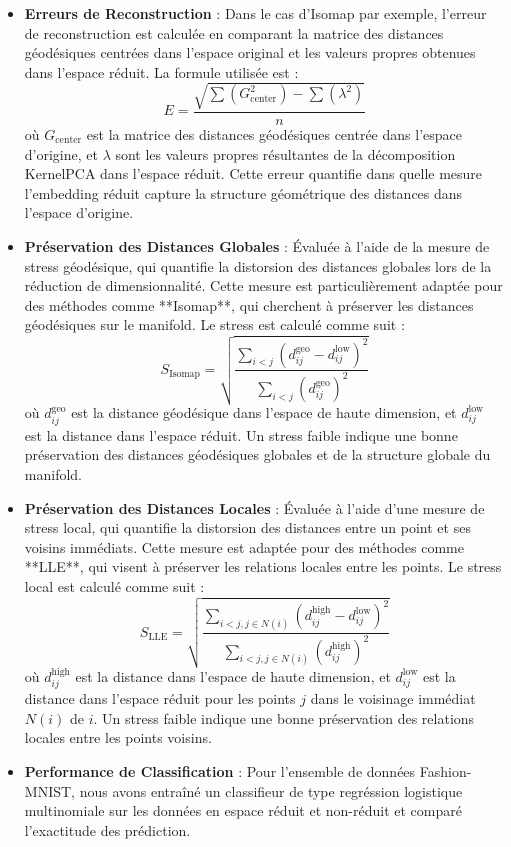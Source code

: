\documentclass[unnumsec,webpdf,modern,large]{projet_manifold}%
\theoremstyle{thmstyleone}%
\theoremstyle{thmstyletwo}%
\theoremstyle{thmstylethree}%
\begin{document}
\begin{itemize} 
    \item \textbf{Erreurs de Reconstruction} : Dans le cas d'Isomap par exemple, l'erreur de reconstruction est calculée en comparant la matrice des distances géodésiques centrées dans l'espace original et les valeurs propres obtenues dans l'espace réduit. La formule utilisée est :
    \begin{equation}
    E = \frac{\sqrt{\sum (G_{\text{center}}^2) - \sum (\lambda^2)}}{n}
    \end{equation}
    où $G_{\text{center}}$ est la matrice des distances géodésiques centrée dans l'espace d'origine, et $\lambda$ sont les valeurs propres résultantes de la décomposition KernelPCA dans l'espace réduit. Cette erreur quantifie dans quelle mesure l'embedding réduit capture la structure géométrique des distances dans l'espace d'origine.


    \item \textbf{Préservation des Distances Globales} : Évaluée à l'aide de la mesure de stress géodésique, qui quantifie la distorsion des distances globales lors de la réduction de dimensionnalité. Cette mesure est particulièrement adaptée pour des méthodes comme **Isomap**, qui cherchent à préserver les distances géodésiques sur le manifold. Le stress est calculé comme suit :
    \begin{equation}
    S_{\text{Isomap}} = \sqrt{\frac{\sum_{i < j} (d_{ij}^{\text{geo}} - d_{ij}^{\text{low}})^2}{\sum_{i < j} (d_{ij}^{\text{geo}})^2}}
    \end{equation}
    où $d_{ij}^{\text{geo}}$ est la distance géodésique dans l'espace de haute dimension, et $d_{ij}^{\text{low}}$ est la distance dans l'espace réduit. Un stress faible indique une bonne préservation des distances géodésiques globales et de la structure globale du manifold.

\item \textbf{Préservation des Distances Locales} : Évaluée à l'aide d'une mesure de stress local, qui quantifie la distorsion des distances entre un point et ses voisins immédiats. Cette mesure est adaptée pour des méthodes comme **LLE**, qui visent à préserver les relations locales entre les points. Le stress local est calculé comme suit :
    \begin{equation}
    S_{\text{LLE}} = \sqrt{\frac{\sum_{i < j, j \in N(i)} (d_{ij}^{\text{high}} - d_{ij}^{\text{low}})^2}{\sum_{i < j, j \in N(i)} (d_{ij}^{\text{high}})^2}}
    \end{equation}
    où $d_{ij}^{\text{high}}$ est la distance dans l'espace de haute dimension, et $d_{ij}^{\text{low}}$ est la distance dans l'espace réduit pour les points $j$ dans le voisinage immédiat $N(i)$ de $i$. Un stress faible indique une bonne préservation des relations locales entre les points voisins.

    \item \textbf{Performance de Classification} : Pour l'ensemble de données Fashion-MNIST, nous avons entraîné un classifieur de type regréssion logistique multinomiale sur les données en espace réduit et non-réduit et comparé l'exactitude des prédiction.
\end{itemize}
\end{document}
